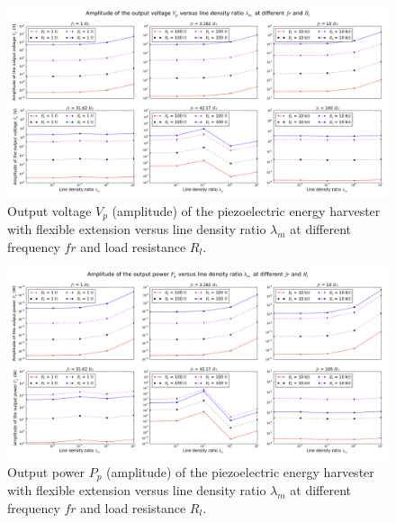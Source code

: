 \documentclass{elsarticle}
\begin{document}
\begin{figure}[!htbp]
    \centering
    \includegraphics[width=\textwidth]{./fig_vol_fr_sl_Rl_sl_vs_lamm}
    \caption{Output voltage $V_p$ (amplitude) of the piezoelectric energy harvester with flexible extension versus line density ratio $\lambda_m$ at different frequency $fr$ and load resistance $R_l$. }
    \label{fig:fig_vol_fr_sl_Rl_sl_vs_lamm}
\end{figure}


\begin{figure}[!htbp]
    \centering
    \includegraphics[width=\textwidth]{./fig_pow_fr_sl_Rl_sl_vs_lamm}
    \caption{Output power $P_p$ (amplitude) of the piezoelectric energy harvester with flexible extension versus line density ratio $\lambda_m$ at different frequency $fr$ and load resistance $R_l$. }
    \label{fig:fig_pow_fr_sl_Rl_sl_vs_lamm}
\end{figure}
\end{document}
